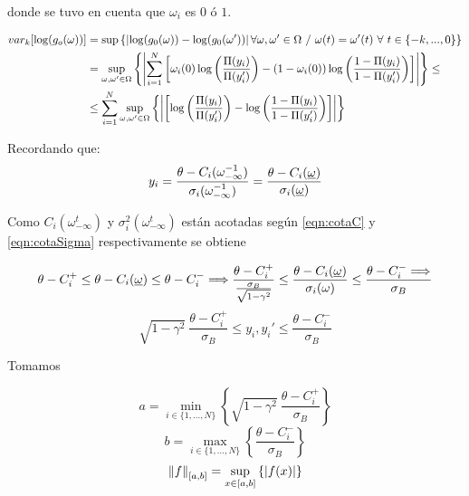 donde se tuvo en cuenta que $\omega_i$ es $0$ ó $1$.

\begin{align}
\nonumber    var_k[\log(g_o(\omega))] &= \sup \left\{  \left|\log(g_0(\omega)) - \log(g_0(\omega'))\right|  \forall \omega,\omega' \in \Omega \ / \  \omega(t) = \omega'(t) \ \forall \ t \in \{-k,...,0\} \right\}\\
\nonumber    &=\sup_{\omega,\omega' \in \Omega} \left\{  \left|\sum_{i=1}^N \left[ \omega_i(0) \log\left(\frac{\Pi(y_i)}{\Pi(y_i')}\right) - (1-\omega_i(0)) \log \left(\frac{1-\Pi(y_i)}{1-\Pi(y_i')} \right) \right]\right| \right\} \leq \\
    & \leq \sum_{i=1}^N \sup_{\omega,\omega' \in \Omega} \left\{  \left| \left[ \log\left(\frac{\Pi(y_i)}{\Pi(y_i')}\right) - \log\left(\frac{1-\Pi(y_i)}{1-\Pi(y_i')}\right) \right]\right| \right\}
    \label{eqn:varlog1}
\end{align}

Recordando que:
\begin{align*}
    y_i= \frac{\theta - C_i(\omega_{-\infty}^{-1})} {\sigma_i(\omega_{-\infty}^{-1})} = 
         \frac{\theta - C_i(\underline{\omega})} {\sigma_i(\underline{\omega})}
\end{align*}

Como $C_i(\omega_{-\infty}^t)$ y $\sigma_i^2(\omega_{-\infty}^t)$ están acotadas según \eqref{eqn:cotaC} y \eqref{eqn:cotaSigma} respectivamente se obtiene

\begin{equation}
    \theta - C_i^+ \leq \theta - C_i(\underline{\omega}) \leq \theta - C_i^- \Longrightarrow
    \frac{\theta - C_i^+}{\frac{\sigma_B}{\sqrt{1-\gamma^2}}} \leq \frac{\theta - C_i(\underline{\omega})}{\sigma_i(\omega)} \leq \frac{\theta - C_i^- \Longrightarrow }{\sigma_B}    
\end{equation}
\begin{equation}
    \sqrt{1-\gamma^2}~\frac{\theta - C_i^+}{\sigma_B} \leq y_i, y_i' \leq \frac{\theta - C_i^- }{\sigma_B}
\end{equation}

Tomamos 

\begin{equation*}
    a= \min_{i\in\{1,...,N\}} \left\{\sqrt{1-\gamma^2}~\frac{\theta - C_i^+}{\sigma_B} \right\}
\end{equation*}
\begin{equation*}
    b= \max_{i\in\{1,...,N\}} \left\{\frac{\theta - C_i^-}{\sigma_B} \right\}
\end{equation*}
\begin{equation*}
    \left\lVert f\right\rVert_{[a,b]} = \sup_{x\in[a,b]} \left\{ \left|f(x)\right|\right\}
\end{equation*}

